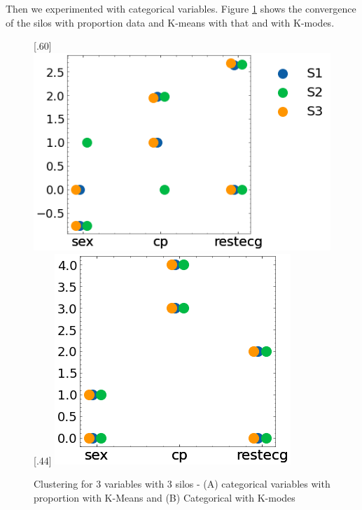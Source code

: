 Then we experimented with categorical variables. Figure \ref{fig:cluster_3_cat} shows the convergence of the silos with proportion data and K-means with that and with K-modes.
\begin{figure}[ht]
\caption{Clustering for 3 variables with 3 silos - (A) categorical variables with  proportion with K-Means and (B)  Categorical with K-modes  }\label{fig:cluster_3_cat} 
  [.60\linewidth]{%
    \includegraphics[width=\linewidth]{figures/my_cluster_3_cat.png}%
  }%
  \hfill
  [.44\linewidth]{%
    \includegraphics[width=\linewidth]{figures/my_cluster_3_cat_kmodes.png}%
  }
\end{figure}

